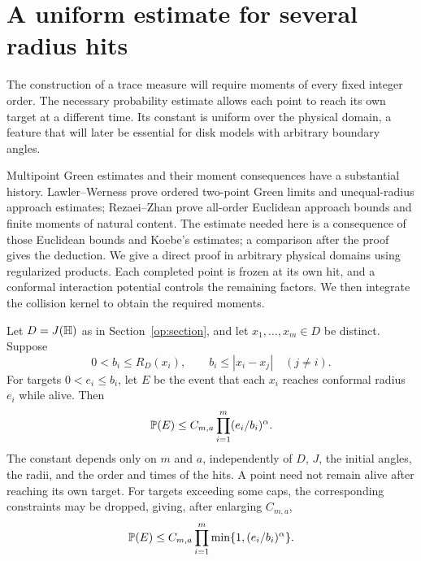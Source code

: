\section{A uniform estimate for several radius hits}
\label{mp:section}

The construction of a trace measure will require moments of every fixed
integer order. The necessary probability estimate allows each point to
reach its own target at a different time. Its constant is uniform over
the physical domain, a feature that will later be essential for disk
models with arbitrary boundary angles.

Multipoint Green estimates and their moment consequences have a substantial
history. Lawler--Werness \cite[Theorems~1--2]{LawlerWerness2013}
prove ordered two-point Green limits and unequal-radius approach estimates;
Rezaei--Zhan \cite[Theorems~1.1--1.2]{RezaeiZhan2017} prove all-order
Euclidean approach bounds and finite moments of natural content.
The estimate needed here is a consequence of those Euclidean bounds and
Koebe's estimates; a comparison after the proof gives the deduction.
We give a direct proof in arbitrary physical domains using regularized
products. Each completed point is frozen at its own hit, and a conformal
interaction potential controls the remaining factors. We then integrate
the collision kernel to obtain the required moments.

\begin{proposition}\label{mp:estimate}
Let $D=J(\mathbb H)$ as in Section~\ref{op:section}, and let
$x_1,\ldots,x_m\in D$ be distinct. Suppose
\[
 0<b_i\le R_D(x_i),\qquad b_i\le |x_i-x_j|\quad(j\ne i).
\]
For targets $0<e_i\le b_i$, let $E$ be the event that each $x_i$
reaches conformal radius $e_i$ while alive. Then
\begin{equation}
 \mathbb P(E)\le C_{m,a}\prod_{i=1}^m(e_i/b_i)^\alpha.
 \label{mp:hit-bound}
\end{equation}
The constant depends only on $m$ and $a$, independently of $D$, $J$,
the initial angles, the radii, and the order and times of the hits.
A point need not remain alive after reaching its own target.
For targets exceeding some caps, the corresponding constraints may be
dropped, giving, after enlarging $C_{m,a}$,
\begin{equation}
 \mathbb P(E)\le C_{m,a}
                \prod_{i=1}^m\min\{1,(e_i/b_i)^\alpha\}.
 \label{mp:capped-hit-bound}
\end{equation}
\end{proposition}

